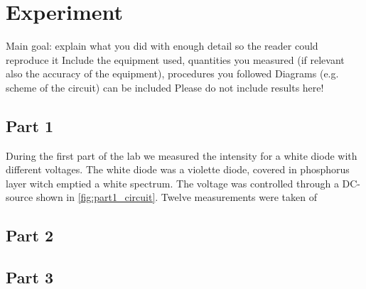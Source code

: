 \section{Experiment}

Main goal: explain what you did with enough detail so the reader could reproduce it
Include the equipment used, quantities you measured (if relevant also the accuracy of the
equipment), procedures you followed
Diagrams (e.g. scheme of the circuit) can be included
Please do not include results here!



\subsection{Part 1}
During the first part of the lab we measured the intensity for a white diode with different voltages. The white diode was a violette diode, covered in phosphorus layer witch emptied a white spectrum. The voltage was controlled through a DC-source shown in \autoref{fig:part1_circuit}. Twelve measurements were taken of 


    
\subsection{Part 2}


\subsection{Part 3}




